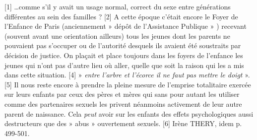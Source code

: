 [1] …comme s'il y avait un usage normal, correct du sexe entre générations différentes au sein des familles ?
[2] A cette époque c'était encore le Foyer de l'Enfance de Paris (anciennement » dépôt de l'Assistance Publique » ) recevant (souvent avant une orientation ailleurs) tous les jeunes dont les parents ne pouvaient pas s'occuper ou de l'autorité desquels ils avaient été soustraits par décision de justice. On plaçait et place toujours dans les foyers de l'enfance les jeunes qui n'ont pas d'autre lieu où aller, quelle que soit la raison qui les a mis dans cette situation. 
[4] » \emph{entre l'arbre et l'écorce il ne faut pas mettre le doigt} ».
[5] Il nous reste encore à prendre la pleine mesure de l'emprise totalitaire exercée sur leurs enfants par ceux des pères et mères qui sans pour autant les utiliser comme des partenaires sexuels les privent néanmoins activement de leur autre parent de naissance. Cela \emph{peut} avoir sur les enfants des effets psychologiques aussi destructeurs que des » abus » ouvertement sexuels.
[6] Irène THERY, idem p. 499-501.